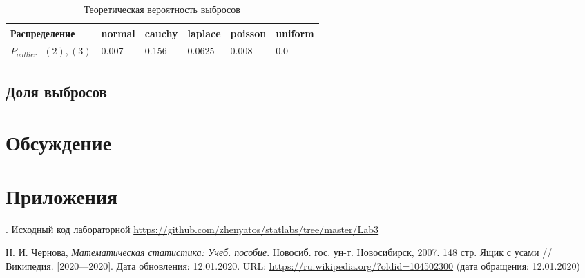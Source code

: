 \documentclass[12pt,a4paper]{article}
\begin{document}
\begin{table}[h!]
	\centering
	\begin{tabular}{|l|l|l|l|l|l|}
		\hline
		Распределение&normal&cauchy&laplace&poisson&uniform  \\ \hline
		$P_{outlier}\text{	} \hyperref[2]{(2)},\hyperref[3]{(3)}$
		&0.007  &0.156  &0.0625  &0.008  &0.0  \\ \hline
	\end{tabular}
	\caption{Теоретическая вероятность выбросов}
\end{table}

\subsection{Доля выбросов}

\pagebreak

\section{Обсуждение}
	
\pagebreak

\section{Приложения}
. Исходный код лабораторной {\url{https://github.com/zhenyatos/statlabs/tree/master/Lab3}}

\begin{thebibliography}{9} 
	 Н. И. Чернова, \emph{Математическая статистика: Учеб. пособие}. Новосиб. гос. ун-т. Новосибирск, 2007. 148 стр.
	 Ящик с усами // Википедия. [2020—2020]. Дата обновления: 12.01.2020. URL: \url{https://ru.wikipedia.org/?oldid=104502300} (дата обращения: 12.01.2020)
\end{thebibliography}
\end{document}
